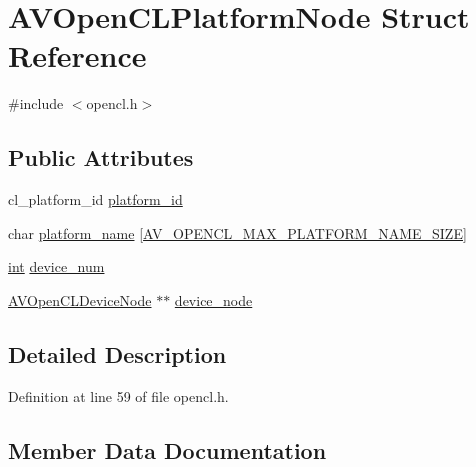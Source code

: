 \hypertarget{struct_a_v_open_c_l_platform_node}{}\section{A\+V\+Open\+C\+L\+Platform\+Node Struct Reference}
\label{struct_a_v_open_c_l_platform_node}


{\ttfamily \#include $<$opencl.\+h$>$}

\subsection*{Public Attributes}
\begin{DoxyCompactItemize}
\item 
cl\+\_\+platform\+\_\+id \hyperlink{struct_a_v_open_c_l_platform_node_a02647b5b2a64d1761f48ca36cd339419}{platform\+\_\+id}
\item 
char \hyperlink{struct_a_v_open_c_l_platform_node_afe033381b1ff0feae605c075183b9528}{platform\+\_\+name} \mbox{[}\hyperlink{opencl_8h_abbbeb8cea0f94a149419ef809abc41a9}{A\+V\+\_\+\+O\+P\+E\+N\+C\+L\+\_\+\+M\+A\+X\+\_\+\+P\+L\+A\+T\+F\+O\+R\+M\+\_\+\+N\+A\+M\+E\+\_\+\+S\+I\+ZE}\mbox{]}
\item 
\hyperlink{xmltok_8h_a5a0d4a5641ce434f1d23533f2b2e6653}{int} \hyperlink{struct_a_v_open_c_l_platform_node_ab5e146a2528a5f697f12b05fb2711599}{device\+\_\+num}
\item 
\hyperlink{struct_a_v_open_c_l_device_node}{A\+V\+Open\+C\+L\+Device\+Node} $\ast$$\ast$ \hyperlink{struct_a_v_open_c_l_platform_node_a7e7d9bc19eda4c18962ab50605d12bf7}{device\+\_\+node}
\end{DoxyCompactItemize}


\subsection{Detailed Description}


Definition at line 59 of file opencl.\+h.



\subsection{Member Data Documentation}
